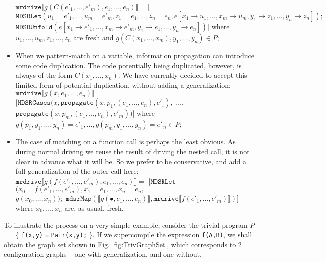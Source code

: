\documentclass[submission,copyright,creativecommons]{eptcs}
\begin{document}
\begin{itemize}
    $\mathtt{mrdrive} \llbracket g(C(e'_1, \ldots, e'_m), e_1, \ldots, e_n) \rrbracket = [$
    $\mathtt{MDSRLet}(u_1=e'_1, \ldots, u_m=e'_m, z_1=e_1, \ldots, z_n=e_n, e [ x_1\rightarrow u_1, \ldots, x_m\rightarrow u_m, y_1 \rightarrow z_1, \ldots, y_n \rightarrow z_n ]);$ 
    $\mathtt{MDSRUnfold}(e [ x_1\rightarrow e'_1, \ldots, x_m\rightarrow e'_m, y_1 \rightarrow e_1, \ldots, y_n \rightarrow e_n ])]$
    where $u_1, \ldots, u_m, z_1, \ldots, z_n$ are fresh and $g(C(x_1, \ldots, x_m), y_1, \ldots, y_n) \in P$;
  \item When we pattern-match on a variable, information propagation can introduce some code duplication. 
    The code potentially being duplicated, however, is always of the form $C(x_1, \ldots, x_n)$.
    We have currently decided to accept this limited form of potential duplication, without adding a generalization: \\
    $\mathtt{mrdrive} \llbracket g(x, e_1, \ldots, e_n) \rrbracket =$
    $[\mathtt{MDSRCases}(x, \mathtt{propagate}(x, p_1, (e_1, \ldots, e_n), e'_1),$ $\ldots,$ \\
    $\mathtt{propagate}(x, p_m, (e_1, \ldots, e_n), e'_m))]$
    where $g(p_1, y_1, \ldots, y_n) = e'_1, \ldots, g(p_m, y_1, \ldots, y_n) = e'_m \in P$;
  \item The case of matching on a function call is perhaps the least obvious. 
    As during normal driving we reuse the result of driving the nested call, it is not clear in advance what
    it will be.
    So we prefer to be conservative, and add a full generalization of the outer call here: \\
    $\mathtt{mrdrive} \llbracket g(f(e'_1, \ldots, e'_m), e_1, \ldots, e_n) \rrbracket =$
    $[\mathtt{MDSRLet}$ $(x_0=f(e'_1, \ldots, e'_m), x_1=e_1, \ldots, x_n=e_n,$ \\
    $g(x_0, \ldots, x_n));$ 
    $\mathtt{mdsrMap}(\llbracket g(\bullet, e_1, \ldots, e_n) \rrbracket, \mathtt{mrdrive} \llbracket f(e'_1, \ldots, e'_m) \rrbracket)]$
    where $x_0, \ldots, x_n$ are, as usual, fresh.
\end{itemize}

To illustrate the process on a very simple example, consider the trivial program 
$P$ $=$ $\{$ \verb|f(x,y)| \verb|=| \verb|Pair(x,y);| $\}$. 
If we supercompile the expression \verb|f(A,B)|, we shall obtain the graph set shown in Fig. \ref{fig:TrivGraphSet},
which corresponds to 2 configuration graphs -- one with generalization, and one without.
\end{document}
